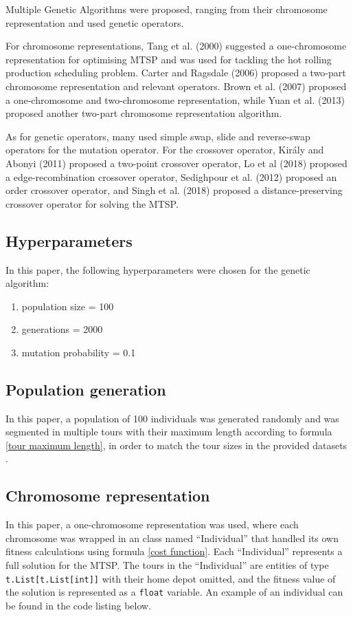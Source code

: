 \documentclass[conference]{IEEEtran}
\begin{document}
Multiple Genetic Algorithms were proposed, ranging from their chromosome representation and used genetic operators.

For chromosome representations, Tang et al. (2000) suggested a one-chromosome representation for optimising MTSP and was
used for tackling the hot rolling production scheduling problem. Carter and Ragsdale (2006) proposed a two-part chromosome
representation and relevant operators. Brown et al. (2007) proposed a one-chromosome and two-chromosome representation, while
Yuan et al. (2013) proposed another two-part chromosome representation algorithm.

As for genetic operators, many used simple swap, slide and reverse-swap operators for the mutation operator. For the crossover
operator, Király and Abonyi (2011) proposed a two-point crossover operator, Lo et al (2018) proposed a edge-recombination crossover
operator, Sedighpour et al. (2012) proposed an order crossover operator, and Singh et al. (2018) proposed a distance-preserving
crossover operator for solving the MTSP.

\subsection{Hyperparameters}
In this paper, the following hyperparameters were chosen for the genetic algorithm:
\begin{enumerate}
    \item population size = 100
    \item generations = 2000
    \item mutation probability = 0.1
\end{enumerate}

\subsection{Population generation} \label{Genetic algorithm population generation}
In this paper, a population of 100 individuals was generated randomly and was segmented in multiple tours with their maximum
length according to formula \ref{tour maximum length}, in order to match the tour sizes in the provided datasets \cite{b5}.

\subsection{Chromosome representation}
In this paper, a one-chromosome representation was used, where each chromosome was wrapped in an class named ``Individual''
that handled its own fitness calculations using formula \ref{cost function}. Each ``Individual'' represents a full solution
for the MTSP. The tours in the ``Individual'' are entities of type \texttt{t.List[t.List[int]]} with their home depot omitted,
and the fitness value of the solution is represented as a \texttt{float} variable. An example of an individual can be found
in the code listing below.
\end{document}
